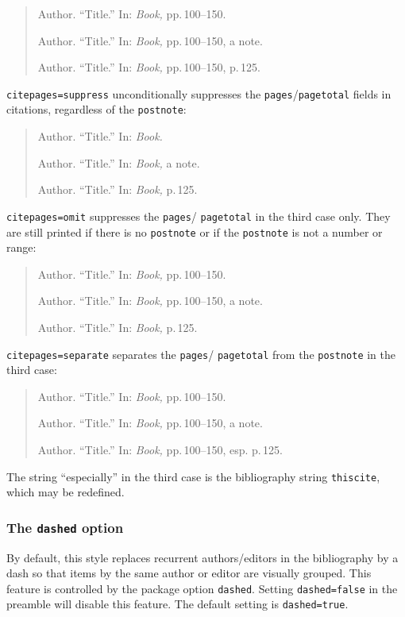 \documentclass[a4paper]{article}
\begin{document}
\begin{quote}
Author. \enquote{Title.} In: \emph{Book,} pp.\,100--150.

Author. \enquote{Title.} In: \emph{Book,} pp.\,100--150, a note.

Author. \enquote{Title.} In: \emph{Book,} pp.\,100--150, p.\,125.
\end{quote}
%
\texttt{citepages=suppress} unconditionally suppresses the
\texttt{pages}\slash \texttt{pagetotal} fields in citations,
regardless of the \texttt{postnote}:

\begin{quote}
Author. \enquote{Title.} In: \emph{Book.}

Author. \enquote{Title.} In: \emph{Book,} a note.

Author. \enquote{Title.} In: \emph{Book,} p.\,125.
\end{quote}
%
\texttt{citepages=omit} suppresses the \texttt{pages}\slash
\texttt{pagetotal} in the third case only. They are still printed if
there is no \texttt{postnote} or if the \texttt{postnote} is not a
number or range:

\begin{quote}
Author. \enquote{Title.} In: \emph{Book,} pp.\,100--150.

Author. \enquote{Title.} In: \emph{Book,} pp.\,100--150, a note.

Author. \enquote{Title.} In: \emph{Book,} p.\,125.
\end{quote}
%
\texttt{citepages=separate} separates the \texttt{pages}\slash
\texttt{pagetotal} from the \texttt{postnote} in the third case:

\begin{quote}
Author. \enquote{Title.} In: \emph{Book,} pp.\,100--150.

Author. \enquote{Title.} In: \emph{Book,} pp.\,100--150, a note.

Author. \enquote{Title.} In: \emph{Book,} pp.\,100--150, esp. p.\,125.
\end{quote}
%
The string \enquote{especially} in the third case is the bibliography
string \texttt{thiscite}, which may be redefined.

\subsubsection*{The \texttt{dashed} option}

By default, this style replaces recurrent authors/editors in the
bibliography by a dash so that items by the same author or editor
are visually grouped. This feature is controlled by the package
option \texttt{dashed}. Setting \texttt{dashed=false} in the
preamble will disable this feature. The default setting is
\texttt{dashed=true}.
\end{document}
